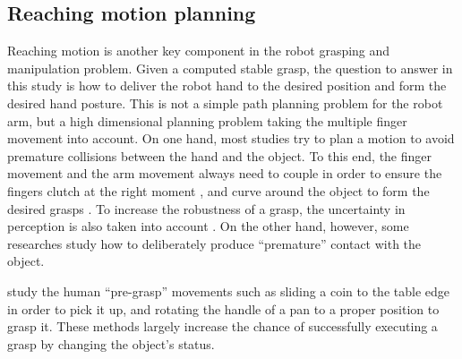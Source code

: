 \subsection{Reaching motion planning}
\label{cha2:sec1:reaching}

Reaching motion is another key component in the robot grasping and manipulation problem. Given a computed stable grasp, the question to answer in this study is how to deliver the robot hand to the desired position and form the desired hand posture. This is not a simple path planning problem for the robot arm, but a high dimensional planning problem taking the multiple finger movement into account. On one hand, most studies try to plan a motion to avoid premature collisions between the hand and the object. To this end, the finger movement and the arm movement always need to couple in order to ensure the fingers clutch at the right moment \citep{Shukla2011CDS}, and curve around the object to form the desired grasps \citep{kroemer2011grasping}. To increase the robustness of a grasp, the uncertainty in perception is also taken into account \citep{stulp2011learning}. On the other hand, however, some researches study how to deliberately produce ``premature'' contact with the object.

\citet{chang2010planning} study the human ``pre-grasp'' movements such as sliding a coin to the table edge in order to pick it up, and rotating the handle of a pan to a proper position to grasp it. These methods largely increase the chance of successfully executing a grasp by changing the object's status.

